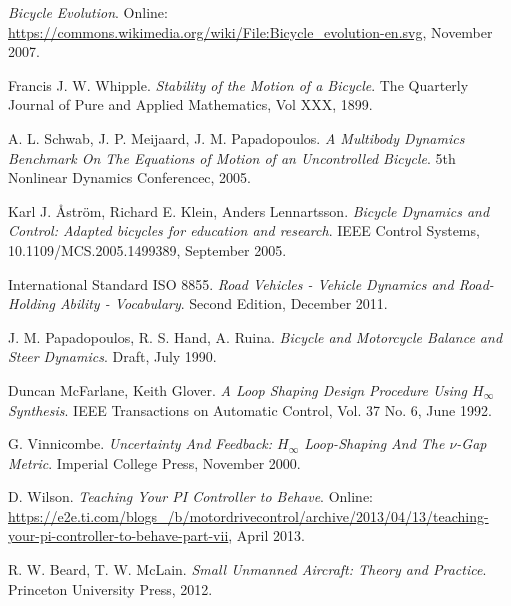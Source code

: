 \begin{thebibliography}{9}
\textit{Bicycle Evolution}. Online: \url{https://commons.wikimedia.org/wiki/File:Bicycle_evolution-en.svg}, November 2007.

Francis J. W. Whipple. \textit{Stability of the Motion of a Bicycle}. The Quarterly Journal of Pure and Applied Mathematics, Vol XXX, 1899.

A. L. Schwab, J. P. Meijaard, J. M. Papadopoulos. \textit{A Multibody Dynamics Benchmark On The Equations of Motion of an Uncontrolled Bicycle}. 5th Nonlinear Dynamics Conferencec, 2005. 

Karl J. \AA str{\"o}m, Richard E. Klein, Anders Lennartsson. \textit{Bicycle Dynamics and Control: Adapted bicycles for education and research}. IEEE Control Systems, 10.1109/MCS.2005.1499389, September 2005.
 
International Standard ISO 8855. \textit{Road Vehicles - Vehicle Dynamics and Road-Holding Ability - Vocabulary}. Second Edition, December 2011.

J. M. Papadopoulos, R. S. Hand, A. Ruina. \textit{Bicycle and Motorcycle Balance and Steer Dynamics}. Draft, July 1990.

Duncan McFarlane, Keith Glover. 
\textit{A Loop Shaping Design Procedure Using $H_{\infty}$ Synthesis}. IEEE Transactions on Automatic Control, Vol. 37 No. 6, June 1992.

G. Vinnicombe. \textit{Uncertainty And Feedback: $H_{\infty}$ Loop-Shaping And The $\nu$-Gap Metric}. Imperial College Press, November 2000.

D. Wilson. \textit{Teaching Your PI Controller to Behave}. Online: \url{https://e2e.ti.com/blogs_/b/motordrivecontrol/archive/2013/04/13/teaching-your-pi-controller-to-behave-part-vii}, April 2013.

R. W. Beard, T. W. McLain. \textit{Small Unmanned Aircraft: Theory and Practice}. Princeton University Press, 2012.

\end{thebibliography}